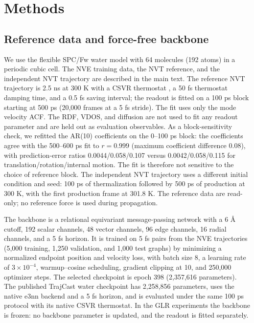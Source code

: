 \section{Methods}

\subsection{Reference data and force-free backbone}

We use the flexible SPC/Fw water model \citep{spcfw} with 64 molecules (192 atoms) in a periodic
cubic cell. The NVE training data, the NVT reference, and the independent NVT trajectory are
described in the main text. The reference NVT trajectory is 2.5 ns at 300 K with a CSVR
thermostat \citep{csvr}, a 50 fs thermostat damping time, and a 0.5 fs saving interval; the
readout is fitted on a 100 ps block starting at 500 ps (20,000 frames at a 5 fs stride). The fit
uses only the mode velocity ACF. The RDF, VDOS, and diffusion are not used to fit any readout
parameter and are held out as evaluation observables. As a block-sensitivity check, we refitted
the AR(10) coefficients on the 0--100 ps block: the coefficients agree with the 500--600 ps fit
to \(r=0.999\) (maximum coefficient difference 0.08), with prediction-error ratios
0.0044/0.058/0.107 versus 0.0042/0.058/0.115 for translation/rotation/internal motion. The fit is
therefore not sensitive to the choice of reference block. The
independent NVT trajectory uses a different initial condition and seed: 100 ps of thermalization
followed by 500 ps of production at 300 K, with the first production frame at 301.8 K. The
reference data are read-only; no reference force is used during propagation.

The backbone is a relational equivariant message-passing network with a 6 \AA{} cutoff,
192 scalar channels, 48 vector channels, 96 edge channels, 16 radial channels, and a 5 fs
horizon. It is trained on 5 fs pairs from the NVE trajectories (5,000 training, 1,250 validation,
and 1,000 test graphs) by minimizing a normalized endpoint position and velocity loss, with batch
size 8, a learning rate of \(3\times10^{-4}\), warmup--cosine scheduling, gradient clipping at 10,
and 250,000 optimizer steps. The selected checkpoint is epoch 398 (2,357,616 parameters). The
published TrajCast water checkpoint \citep{trajcast} has 2,258,856 parameters, uses the native e3nn
backend \citep{e3nn} and a 5 fs horizon, and is evaluated under the same 100 ps protocol with its
native CSVR thermostat. In the GLR experiments the backbone is frozen: no backbone parameter is updated, and
the readout is fitted separately.

